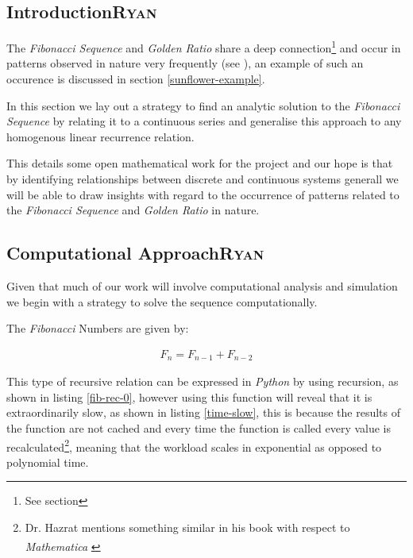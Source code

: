 \documentclass[a4paper,11pt,twoside]{article}
\begin{document}
\subsection{Introduction\hfill{}\textsc{Ryan}}
\label{sec:orgb3405cc}
The \emph{Fibonacci Sequence} and \emph{Golden Ratio} share a deep connection\footnote{See section} and occur in patterns observed in nature very frequently
(see
\cite{shellyallenFibonacciNature,benedettapalazzoNumbersNatureFibonacci2016,MinarovaNikoletta2014TFSN,NatureGoldenRatio2018,robertlambHowAreFibonacci2008,ronknottFibonacciNumbersGolden2016}), an example of such an occurence is discussed in section \ref{sunflower-example}.


In this section we lay out a strategy to find an analytic solution to the
\emph{Fibonacci Sequence} by relating it to a continuous series and generalise this
approach to any homogenous linear recurrence relation.

This details some open mathematical work for the project and our hope is that by
identifying relationships between discrete and continuous systems generall we
will be able to draw insights with regard to the occurrence of patterns related
to the \emph{Fibonacci Sequence} and \emph{Golden Ratio} in nature.

\subsection{Computational Approach\hfill{}\textsc{Ryan}}
\label{define-the-fibonacci-numbers}
Given that much of our work will involve computational analysis and simulation we begin with a strategy to solve the sequence computationally.

The \emph{Fibonacci} Numbers are given by:

\begin{align}
F_n = F_{n-1} + F_{n-2} \label{eq:fib-def}
\end{align}

This type of recursive relation can be expressed in \emph{Python} by using recursion,
as shown in listing \ref{fib-rec-0}, however using this function will reveal that it
is extraordinarily slow, as shown in listing \ref{time-slow}, this is because the
results of the function are not cached and every time the function is called
every value is recalculated\footnote{Dr. Hazrat mentions something similar in his book with respect to
\emph{Mathematica}\textsuperscript{\textregistered}
\cite[Ch. 13]{hazratMathematicaProblemCenteredApproach2015}}, meaning that the workload scales in
exponential as opposed to polynomial time.
\end{document}
